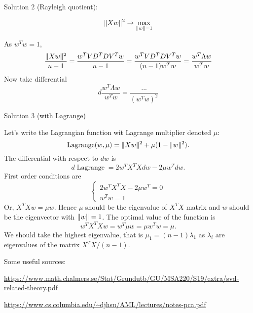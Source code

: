 \documentclass[12pt]{article}
\DeclareMathOperator{\Lagr}{Lagrange}
\DeclarePairedDelimiter{\norm}{\lVert}{\rVert}
\begin{document}
Solution 2 (Rayleigh quotient):

\[
\norm{Xw}^2  \to \max_{\norm{w} = 1}
\]

As $w^Tw = 1$,
\[
    \frac{\norm{Xw}^2}{n - 1} = \frac{w^T VD^T DV^T w}{n-1} = \frac{w^T VD^T DV^T w }{ (n - 1)w^Tw }   = \frac{w^T \Lambda w}{ w^T w}
\]
Now take differential 
\[
d \frac{w^T \Lambda w}{ w^T w} = \frac{...}{ (w^T w)^2}
\]

Solution 3 (with Lagrange)

Let's write the Lagrangian function wit Lagrange multiplier denoted $\mu$:
\[
\Lagr(w, \mu) = \norm{Xw}^2 + \mu (1 - \norm{w}^2).
\]
The differential with respect to $dw$ is 
\[
d \Lagr = 2w^T X^T X dw - 2 \mu w^T dw.
\]
First order conditions are
\[
\begin{cases}
2w^T X^T X - 2 \mu w^T = 0 \\
w^Tw = 1  
\end{cases}
\]
Or, $X^TX w = \mu w$. 
Hence $\mu$ should be the eigenvalue of $X^TX$ matrix and $w$ should be the eigenvector with $\norm{w} = 1$.
The optimal value of the function is 
\[
w^T X^TX w = w^T \mu w = \mu w^T w = \mu.
\]
We should take the highest eigenvalue, that is $\mu_1 = (n - 1)\lambda_1$ as $\lambda_i$ are eigenvalues of the matrix $X^TX/(n-1)$.


Some useful sources:

\url{https://www.math.chalmers.se/Stat/Grundutb/GU/MSA220/S19/extra/svd-related-theory.pdf}

\url{https://www.cs.columbia.edu/~djhsu/AML/lectures/notes-pca.pdf}
\end{document}
